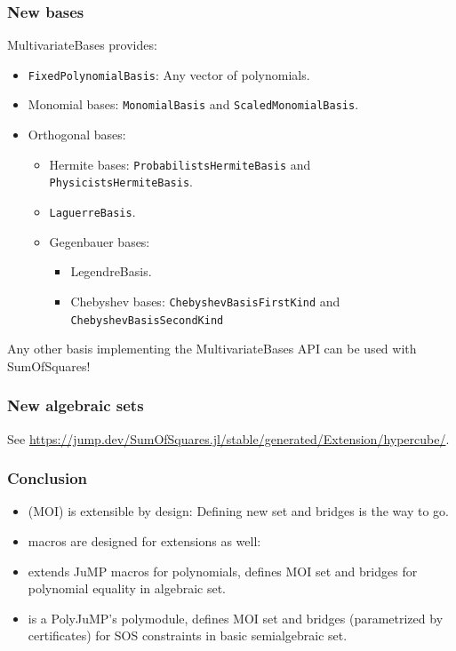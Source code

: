 \documentclass{beamer}
\begin{document}
  \begin{frame}
    \frametitle{New bases}
    MultivariateBases provides:
    \begin{itemize}
      \item \texttt{FixedPolynomialBasis}: \alert{Any} vector of polynomials.
      \item \alert{Monomial} bases: \texttt{MonomialBasis} and \texttt{ScaledMonomialBasis}.
      \item \alert{Orthogonal} bases:
        \begin{itemize}
          \item Hermite bases: \texttt{ProbabilistsHermiteBasis} and \texttt{PhysicistsHermiteBasis}.
          \item \texttt{LaguerreBasis}.
          \item Gegenbauer bases:
            \begin{itemize}
              \item LegendreBasis.
              \item Chebyshev bases: \texttt{ChebyshevBasisFirstKind} and \texttt{ChebyshevBasisSecondKind}
            \end{itemize}
        \end{itemize}
    \end{itemize}
    \alert{Any} other basis implementing the MultivariateBases \alert{API} can be used with SumOfSquares!
  \end{frame}

  \begin{frame}
    \frametitle{New algebraic sets}
    See \url{https://jump.dev/SumOfSquares.jl/stable/generated/Extension/hypercube/}.
  \end{frame}

  \begin{frame}
    \frametitle{Conclusion}
    \begin{itemize}
      \item {} (MOI) is extensible by design:
        Defining new set and bridges is the way to go.
      \item {} macros are designed for extensions as well:
      \item {} extends JuMP macros for polynomials,
        defines MOI set and bridges for polynomial equality in algebraic set.
      \item {} is a PolyJuMP's polymodule,
        defines MOI set and bridges (\alert{parametrized} by \alert{certificates}) for SOS constraints in basic semialgebraic set.
    \end{itemize}
  \end{frame}
\end{document}
